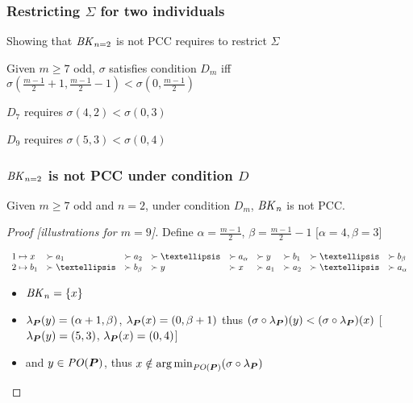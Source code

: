 \documentclass[french, english]{beamer}
\begin{document}
\begin{frame}
	\frametitle{Restricting $\Sigma$ for two individuals}
	Showing that $\BK[n = 2]$ is not PCC requires to restrict $\Sigma$
	\begin{definition}[Condition $D_m$]
		Given $m ≥ 7$ odd, $\sigma$ satisfies condition $D_m$ iff $\sigma(\frac{m - 1}{2} + 1, \frac{m - 1}{2} - 1) < \sigma(0, \frac{m - 1}{2})$
	\end{definition}
	\begin{example}
		$D_7$ requires $\sigma(4, 2) < \sigma(0, 3)$

		$D_9$ requires $\sigma(5, 3) < \sigma(0, 4)$
	\end{example}
\end{frame}

\begin{frame}
	\frametitle{$\BK[n = 2]$ is not PCC under condition $D$}
	\label{sl:bknnotpcc}
	\begin{theorem}
		Given $m ≥ 7$ odd and $n = 2$, under condition $D_m$, $\BK[n]$ is not PCC.
	\end{theorem}
	\begin{proof}[Proof \hfill {\small [illustrations for $m = 9$]}]
		Define $\alpha = \frac{m - 1}{2}$, $\beta = \frac{m - 1}{2} - 1$ \hfill {\small [$\alpha = 4, \beta = 3$]}

		$\begin{array}{r@{\hspace{1mm} \mapsto \hspace{1mm}}lllllllll}
			1 & x &\pref a_1 &\pref a_2 &\pref … &\pref a_\alpha &\pref y &\pref b_1 &\pref … &\pref b_\beta\\
			2 & b_1 &\pref … &\pref b_\beta &\pref y &\pref x &\pref a_1 &\pref a_2 &\pref … &\pref a_\alpha\\
		\end{array}$%
		\begin{itemize} 
			\item $\BK[n] = \set{x}$
			\item $\lambda_{\bm{P}}(y) = (\alpha + 1, \beta)$, $\lambda_{\bm{P}}(x) = (0, \beta + 1)$ thus $(\sigma \circ \lambda_{\bm{P}})(y) < (\sigma \circ \lambda_{\bm{P}})(x)$ \hfill {\small [$\lambda_{\bm{P}}(y) = (5, 3)$, $\lambda_{\bm{P}}(x) = (0, 4)$]}
			\item and $y \in \mathit{PO}(\boldsymbol{P})$, thus $x \notin \operatorname*{arg\,min}_{\mathit{PO}(\boldsymbol{P})}(\sigma \circ \lambda_{\bm{P}})$ \qedhere
		\end{itemize}
	\end{proof}
\end{frame}
\end{document}
